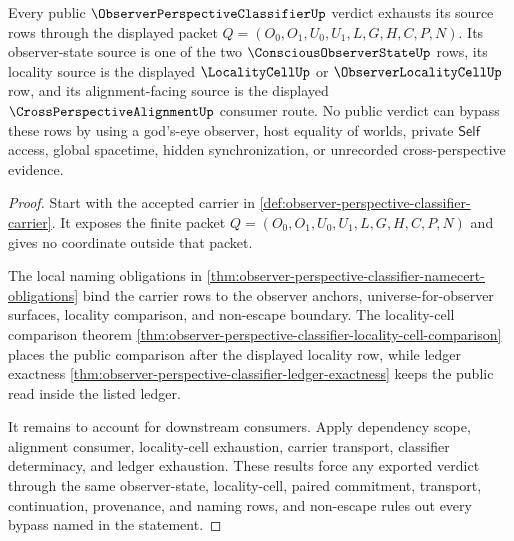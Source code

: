 \begin{theorem}
\label{thm:observer-perspective-classifier-verdict-source-exhaustion}
Every public $\ObserverPerspectiveClassifierUp$ verdict exhausts its source rows through the displayed packet $Q=(O_0,O_1,U_0,U_1,L,G,H,C,P,N)$. Its observer-state source is one of the two $\ConsciousObserverStateUp$ rows, its locality source is the displayed $\LocalityCellUp$ or $\ObserverLocalityCellUp$ row, and its alignment-facing source is the displayed $\CrossPerspectiveAlignmentUp$ consumer route. No public verdict can bypass these rows by using a god's-eye observer, host equality of worlds, private $\mathsf{Self}$ access, global spacetime, hidden synchronization, or unrecorded cross-perspective evidence.
\end{theorem}
\begin{proof}
Start with the accepted carrier in \autoref{def:observer-perspective-classifier-carrier}. It exposes the finite packet $Q=(O_0,O_1,U_0,U_1,L,G,H,C,P,N)$ and gives no coordinate outside that packet.

The local naming obligations in \autoref{thm:observer-perspective-classifier-namecert-obligations} bind the carrier rows to the observer anchors, universe-for-observer surfaces, locality comparison, and non-escape boundary. The locality-cell comparison theorem \autoref{thm:observer-perspective-classifier-locality-cell-comparison} places the public comparison after the displayed locality row, while ledger exactness \autoref{thm:observer-perspective-classifier-ledger-exactness} keeps the public read inside the listed ledger.

It remains to account for downstream consumers. Apply dependency scope, alignment consumer, locality-cell exhaustion, carrier transport, classifier determinacy, and ledger exhaustion. These results force any exported verdict through the same observer-state, locality-cell, paired commitment, transport, continuation, provenance, and naming rows, and non-escape rules out every bypass named in the statement.
\end{proof}

